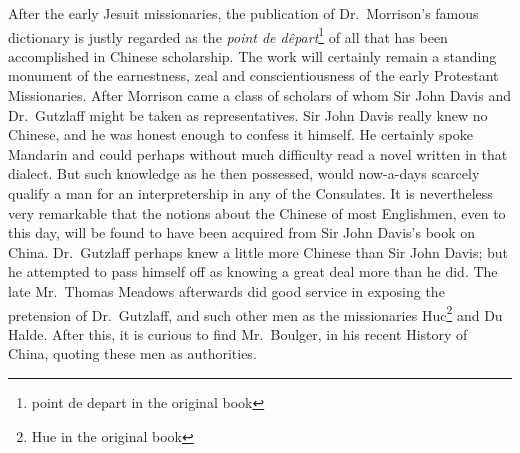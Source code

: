 After the early Jesuit missionaries, the publication of Dr.~Morrison's  famous dictionary is justly regarded as the \emph{point de d\^epart}\footnote{point de depart in the original book}  of all that has been accomplished in Chinese scholarship.
The work will certainly remain a standing monument of the earnestness, zeal and conscientiousness of the early Protestant  Missionaries.
After Morrison came a class of scholars of whom Sir John Davis   and Dr.~Gutzlaff  might be taken as representatives.
Sir John Davis really knew no Chinese, and he was honest enough to confess it himself.
He certainly spoke Mandarin and could perhaps without much difficulty read a novel written in that dialect.
But such knowledge as he then possessed, would now-a-days  scarcely qualify a man for an interpretership in any of the Consulates.
It is nevertheless very remarkable that the notions about the Chinese of most Englishmen, even to this day, will be found to have been acquired from Sir John Davis's book on China.
Dr.~Gutzlaff perhaps knew a little more Chinese than Sir John Davis; but he attempted to pass himself off as knowing a great deal more than he did. 
The late Mr.~Thomas Meadows afterwards did good service in exposing the pretension of Dr.~Gutzlaff, and such other men as the missionaries Huc\footnote{Hue in the original book}  and Du Halde. 
After this, it is curious to find Mr.~Boulger,  in his recent History of China, quoting these men as authorities.

